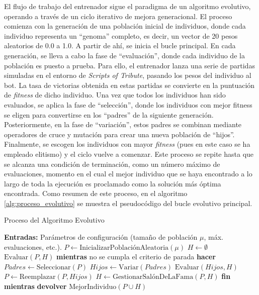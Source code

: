 El flujo de trabajo del entrenador sigue el paradigma de un algoritmo evolutivo, operando a través de un ciclo iterativo de mejora generacional. El proceso comienza con la generación de una población inicial de individuos, donde cada individuo representa un ``genoma'' completo, es decir, un vector de 20 pesos aleatorios de 0.0 a 1.0. A partir de ahí, se inicia el bucle principal. En cada generación, se lleva a cabo la fase de ``evaluación'', donde cada individuo de la población es puesto a prueba. Para ello, el entrenador lanza una serie de partidas simuladas en el entorno de \textit{Scripts of Tribute}, pasando los pesos del individuo al bot. La tasa de victorias obtenida en estas partidas se convierte en la puntuación de \textit{fitness} de dicho individuo. Una vez que todos los individuos han sido evaluados, se aplica la fase de ``selección'', donde los individuos con mejor fitness se eligen para convertirse en los ``padres'' de la siguiente generación. Posteriormente, en la fase de ``variación'', estos padres se combinan mediante operadores de cruce y mutación para crear una nueva población de ``hijos''. Finalmente, se escogen los individuos con mayor \textit{fitness} (pues en este caso se ha empleado elitismo) y el ciclo vuelve a comenzar. Este proceso se repite hasta que se alcanza una condición de terminación, como un número máximo de evaluaciones, momento en el cual el mejor individuo que se haya encontrado a lo largo de toda la ejecución es proclamado como la solución más óptima encontrada. Como resumen de este proceso, en el algoritmo \ref{alg:proceso_evolutivo} se muestra el pseudocódigo del bucle evolutivo principal.

\begin{algorithm}[H]
	\caption{Proceso del Algoritmo Evolutivo}
	\label{alg:proceso_evolutivo}
	\begin{algorithmic}[1]
		\State {}
		\State \textbf{Entradas:} Parámetros de configuración (tamaño de población $\mu$, máx. evaluaciones, etc.).
		\State
		\State $P \leftarrow \text{InicializarPoblaciónAleatoria}(\mu)$
		\State $H \leftarrow \emptyset$ 
		\State $\text{Evaluar}(P, H)$
		\State
		\State \textbf{mientras} no se cumpla el criterio de parada \textbf{hacer}
		\State \quad $Padres \leftarrow \text{Seleccionar}(P)$
		\State \quad $Hijos \leftarrow \text{Variar}(Padres)$
		\State \quad $\text{Evaluar}(Hijos, H)$
		\State \quad $P \leftarrow \text{Reemplazar}(P, Hijos)$
		\State \quad $H \leftarrow \text{GestionarSalónDeLaFama}(P, H)$ 
		\State \textbf{fin mientras}
		\State
		\State \textbf{devolver} $\text{MejorIndividuo}(P \cup H)$
	\end{algorithmic}
\end{algorithm}


